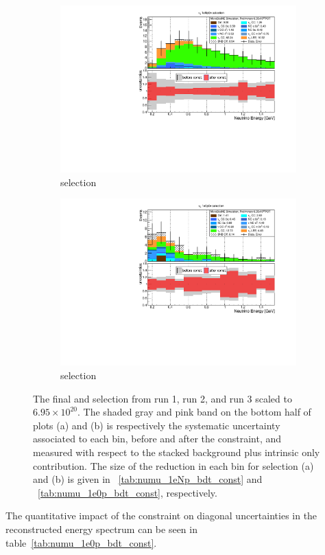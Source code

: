 \begin{center}
\begin{figure}[ht] 
    \begin{subfigure}[b]{0.45\textwidth}
    \centering
    \includegraphics[width=1.00\textwidth]{Sensitivity/newconstraintplots/nue_numu_reco_e_H1_mc_collab_beforeafter_constraint.pdf}
    \caption{\npsel selection}
    \end{subfigure}
    \begin{subfigure}[b]{0.45\textwidth}
    \centering
    \includegraphics[width=1.00\textwidth]{Sensitivity/newconstraintplots/1e0p_numu_reco_e_H1_mc_collab_beforeafter_constraint.pdf}
    \caption{\zpsel selection}
    \end{subfigure}
\caption{\label{fig:numuconstraintzpselnpsel} The final \npsel and \zpsel selection from run 1, run 2, and run 3 scaled to $6.95 \times 10^{20}$. The shaded gray and pink band on the bottom half of plots (a) and (b) is respectively the systematic uncertainty associated to each bin, before and after the constraint, and measured with respect to the stacked background plus intrinsic \nue only contribution. The size of the reduction in each bin for selection (a) and (b) is given in ~\cref{tab:numu_1eNp_bdt_const} and ~\cref{tab:numu_1e0p_bdt_const}, respectively.}
\end{figure}
\end{center}
The quantitative impact of the constraint on diagonal uncertainties in the \npsel reconstructed energy spectrum can be seen in table~\ref{tab:numu_1e0p_bdt_const}.

